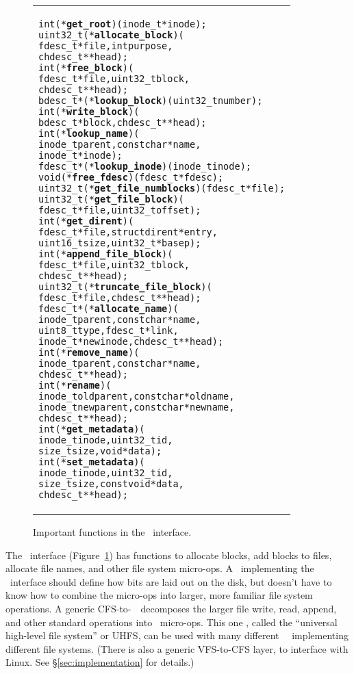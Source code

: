 \begin{figure}[thb]
\vskip-14pt
\begin{tabular}{@{\hskip0.25in}p{2in}@{}}
\begin{scriptsize}
\begin{alltt}
int (*\textbf{get_root})(inode_t *inode);
uint32_t (*\textbf{allocate_block})(
    fdesc_t *file, int purpose,
    chdesc_t **head);
int (*\textbf{free_block})(
    fdesc_t *file, uint32_t block,
    chdesc_t **head);
bdesc_t *(*\textbf{lookup_block})(uint32_t number);
int (*\textbf{write_block})(
    bdesc_t *block, chdesc_t **head);
int (*\textbf{lookup_name})(
    inode_t parent, const char *name,
    inode_t *inode);
fdesc_t *(*\textbf{lookup_inode})(inode_t inode);
void (*\textbf{free_fdesc})(fdesc_t *fdesc);
uint32_t (*\textbf{get_file_numblocks})(fdesc_t *file);
uint32_t (*\textbf{get_file_block})(
    fdesc_t *file, uint32_t offset);
int (*\textbf{get_dirent})(
    fdesc_t *file, struct dirent *entry,
    uint16_t size, uint32_t *basep);
int (*\textbf{append_file_block})(
    fdesc_t *file, uint32_t block,
    chdesc_t **head);
uint32_t (*\textbf{truncate_file_block})(
    fdesc_t *file, chdesc_t **head);
fdesc_t *(*\textbf{allocate_name})(
    inode_t parent, const char *name,
    uint8_t type, fdesc_t *link,
    inode_t *newinode, chdesc_t **head);
int (*\textbf{remove_name})(
    inode_t parent, const char *name,
    chdesc_t **head);
int (*\textbf{rename})(
    inode_t oldparent, const char *oldname,
    inode_t newparent, const char *newname,
    chdesc_t **head);
int (*\textbf{get_metadata})(
    inode_t inode, uint32_t id,
    size_t size, void *data);
int (*\textbf{set_metadata})(
    inode_t inode, uint32_t id,
    size_t size, const void *data,
    chdesc_t **head);
\end{alltt}
\end{scriptsize}
\end{tabular}
\vspace{-10pt}
\caption{\label{fig:lfs} Important functions in the \LFS\ interface.}
\end{figure}

The \LFS\ interface (Figure~\ref{fig:lfs}) has functions to allocate blocks, add
blocks to files, allocate file names, and other file system micro-ops. A
\module\ implementing the \LFS\ interface should define how bits are laid out on
the disk, but doesn't have to know how to combine the micro-ops into larger,
more familiar file system operations. A generic CFS-to-\LFS\ \module\ decomposes
the larger file write, read, append, and other standard operations into \LFS\
micro-ops. This one \module, called the ``universal high-level file system'' or
UHFS, can be used with many different \LFS\ \modules\ implementing different file
systems. (There is also a generic VFS-to-CFS layer, to interface with Linux. See
\S\ref{sec:implementation} for details.)

